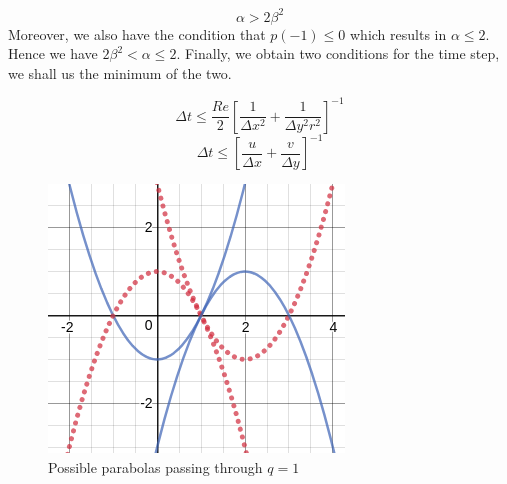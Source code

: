 \documentclass{article}
\begin{document}
\begin{equation}
\alpha > 2 \beta^2
\end{equation}
Moreover, we also have the condition that $p(-1) \leq 0$ which results in $\alpha \leq 2$. Hence we have $2\beta^2<\alpha \leq 2$.
Finally, we obtain two conditions for the time step, we shall us the minimum of the two.

\begin{equation}
\Delta t \leq \frac{Re}{2}\left[\frac{1}{\Delta x^2} + \frac{1}{\Delta y^2r^2}\right]^{-1}
\end{equation}
\begin{equation}
\Delta t \leq  \left[\frac{u}{\Delta x}+\frac{v}{\Delta y}\right]^{-1}
\end{equation}

\begin{figure}[h!]
\centering
\includegraphics[scale=.3]{par1.png}
\caption{Possible parabolas passing through $q=1$}
\label{fig:para1}
\end{figure}
\end{document}
